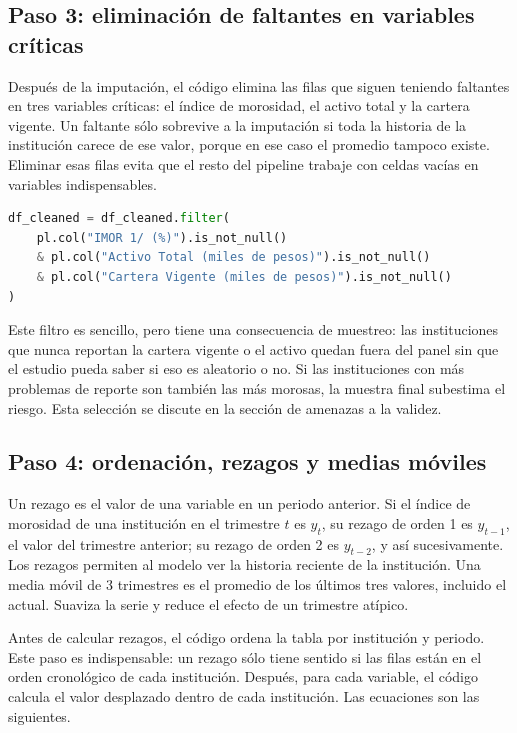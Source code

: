 \subsection{Paso 3: eliminación de faltantes en variables críticas}
Después de la imputación, el código elimina las filas que siguen teniendo faltantes en tres variables críticas: el índice de morosidad, el activo total y la cartera vigente. Un faltante sólo sobrevive a la imputación si toda la historia de la institución carece de ese valor, porque en ese caso el promedio tampoco existe. Eliminar esas filas evita que el resto del pipeline trabaje con celdas vacías en variables indispensables.

\begin{lstlisting}[language=Python, caption={Filtro de filas con faltantes en variables críticas}, label={lst:met_filtro_nulos}]
df_cleaned = df_cleaned.filter(
    pl.col("IMOR 1/ (%)").is_not_null()
    & pl.col("Activo Total (miles de pesos)").is_not_null()
    & pl.col("Cartera Vigente (miles de pesos)").is_not_null()
)
\end{lstlisting}

Este filtro es sencillo, pero tiene una consecuencia de muestreo: las instituciones que nunca reportan la cartera vigente o el activo quedan fuera del panel sin que el estudio pueda saber si eso es aleatorio o no. Si las instituciones con más problemas de reporte son también las más morosas, la muestra final subestima el riesgo. Esta selección se discute en la sección de amenazas a la validez.

\subsection{Paso 4: ordenación, rezagos y medias móviles}
Un rezago es el valor de una variable en un periodo anterior. Si el índice de morosidad de una institución en el trimestre $t$ es $y_t$, su rezago de orden 1 es $y_{t-1}$, el valor del trimestre anterior; su rezago de orden 2 es $y_{t-2}$, y así sucesivamente. Los rezagos permiten al modelo ver la historia reciente de la institución. Una media móvil de 3 trimestres es el promedio de los últimos tres valores, incluido el actual. Suaviza la serie y reduce el efecto de un trimestre atípico.

Antes de calcular rezagos, el código ordena la tabla por institución y periodo. Este paso es indispensable: un rezago sólo tiene sentido si las filas están en el orden cronológico de cada institución. Después, para cada variable, el código calcula el valor desplazado dentro de cada institución. Las ecuaciones son las siguientes.

